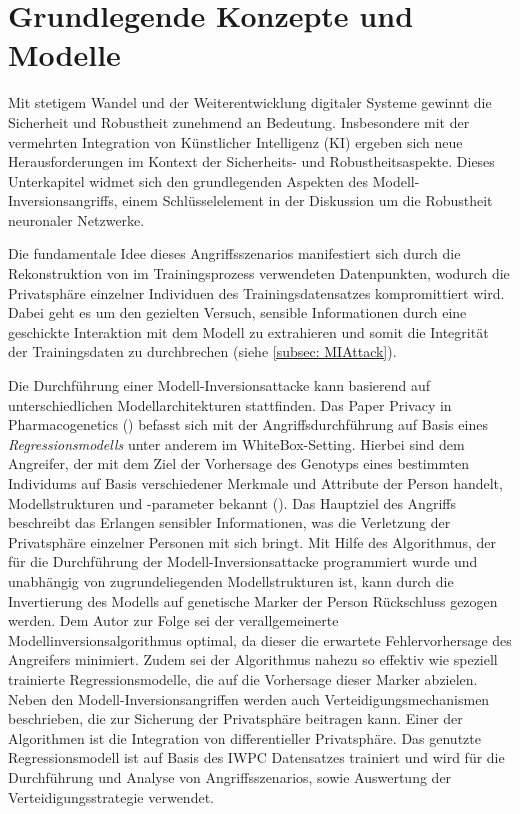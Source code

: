 \section{Grundlegende Konzepte und Modelle}\label{chpt:Stand_der_Technik_MI}
Mit stetigem Wandel und der Weiterentwicklung digitaler Systeme gewinnt die Sicherheit und Robustheit zunehmend an Bedeutung. Insbesondere mit der vermehrten Integration von Künstlicher Intelligenz (KI) ergeben sich neue Herausforderungen im Kontext der Sicherheits- und Robustheitsaspekte. Dieses Unterkapitel widmet sich den grundlegenden Aspekten des Modell-Inversionsangriffs, einem Schlüsselelement in der Diskussion um die Robustheit neuronaler Netzwerke.

Die fundamentale Idee dieses Angriffsszenarios manifestiert sich durch die Rekonstruktion von im Trainingsprozess verwendeten Datenpunkten, wodurch die Privatsphäre einzelner Individuen des Trainingsdatensatzes kompromittiert wird. Dabei geht es um den gezielten Versuch, sensible Informationen durch eine geschickte Interaktion mit dem Modell zu extrahieren und somit die Integrität der Trainingsdaten zu durchbrechen (siehe \ref{subsec: MIAttack}). 

Die Durchführung einer Modell-Inversionsattacke kann basierend auf unterschiedlichen Modellarchitekturen stattfinden. Das Paper \glqq Privacy in Pharmacogenetics\grqq{} (\cite{fredrikson_privacy_2014}) befasst sich mit der Angriffsdurchführung auf Basis eines \textit{Regressionsmodells} unter anderem im WhiteBox-Setting. Hierbei sind dem Angreifer, der mit dem Ziel der Vorhersage des Genotyps eines bestimmten Individums auf Basis verschiedener Merkmale und Attribute der Person handelt, Modellstrukturen und -parameter bekannt (\cite[20]{fredrikson_privacy_2014}). Das Hauptziel des Angriffs beschreibt das Erlangen sensibler Informationen, was die Verletzung der Privatsphäre einzelner Personen mit sich bringt. Mit Hilfe des Algorithmus, der für die Durchführung der Modell-Inversionsattacke programmiert wurde und unabhängig von zugrundeliegenden Modellstrukturen ist, kann durch die Invertierung des Modells auf genetische Marker der Person Rückschluss gezogen werden. Dem Autor zur Folge sei der verallgemeinerte Modellinversionsalgorithmus optimal, da dieser die erwartete Fehlervorhersage des Angreifers minimiert. Zudem sei der Algorithmus nahezu so effektiv wie speziell trainierte Regressionsmodelle, die auf die Vorhersage dieser Marker abzielen. Neben den Modell-Inversionsangriffen werden auch Verteidigungsmechanismen beschrieben, die zur Sicherung der Privatsphäre beitragen kann. Einer der Algorithmen ist die Integration von differentieller Privatsphäre. Das genutzte Regressionsmodell ist auf Basis des IWPC Datensatzes trainiert und wird für die Durchführung und Analyse von Angriffsszenarios, sowie Auswertung der Verteidigungsstrategie verwendet.

